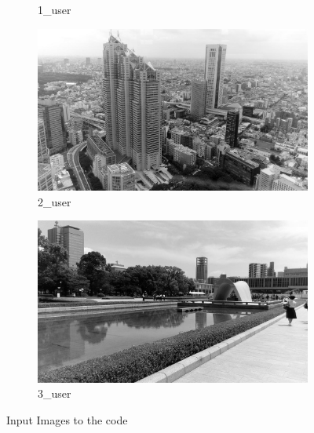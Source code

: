 \documentclass{article}
\begin{document}
\begin{figure}[h!]
\begin{subfigure}[b]{0.4\linewidth}
     \caption{1{\_}user}
  \end{subfigure}
  \begin{subfigure}[b]{0.4\linewidth}
    \includegraphics[width=\linewidth]{2_user.jpg}
     \caption{2{\_}user}
  \end{subfigure}
  \begin{subfigure}[b]{0.4\linewidth}
    \includegraphics[width=\linewidth]{3_user.jpg}
     \caption{3{\_}user}
  \end{subfigure}
  \caption{Input Images to the code}
\end{figure}
\end{document}
